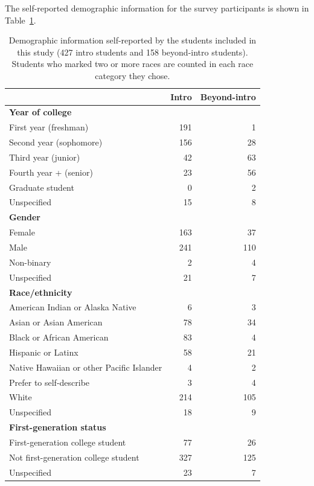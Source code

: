 \documentclass[english,aps,prstper,reprint,showpacs,longbibliography,superscriptaddress,nofootinbib]{revtex4-2}
\begin{document}
The self-reported demographic information for the survey participants is shown in Table~\ref{ta:demographics}.
\begin{table}[tb] 
  \caption{Demographic information self-reported by the students included in this study (427 intro students and 158 beyond-intro students). Students who marked two or more races are counted in each race category they chose.}
  \label{ta:demographics}
  \begin{ruledtabular}
    \begin{tabular}{lrr}
    & Intro & Beyond-intro\\
    \hline
    \textbf{Year of college} \\
    \quad First year (freshman) & 191 & 1\\
    \quad Second year (sophomore) & 156 & 28\\
    \quad Third year (junior) & 42 & 63\\
    \quad Fourth year + (senior) & 23 & 56\\
    \quad Graduate student & 0 & 2\\
    \quad Unspecified & 15 & 8 \\
    \textbf{Gender}\\
    \quad Female & 163 & 37\\
    \quad Male & 241 & 110\\
    \quad Non-binary & 2 & 4\\
    \quad Unspecified & 21 & 7\\
    \textbf{Race/ethnicity}\\
    \quad American Indian or Alaska Native & 6 & 3\\
    \quad Asian or Asian American & 78 & 34 \\
    \quad Black or African American & 83 & 4 \\
    \quad Hispanic or Latinx & 58 & 21 \\
    \quad Native Hawaiian or other Pacific Islander & 4 & 2\\
    \quad Prefer to self-describe & 3 & 4\\
    \quad White & 214 & 105\\
    \quad Unspecified & 18 & 9\\
    \textbf{First-generation status}\\
    \quad First-generation college student & 77 & 26\\
    \quad Not first-generation college student & 327 & 125\\
    \quad Unspecified & 23 & 7\\
    \end{tabular}
  \end{ruledtabular}
\end{table}
\end{document}
